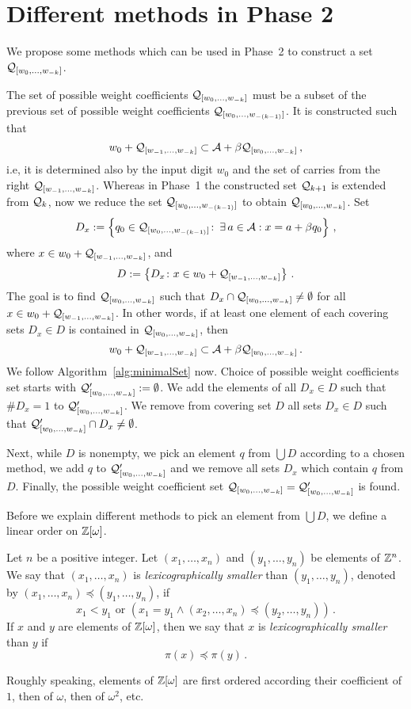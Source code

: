 \section{Different methods in Phase 2}
\label{sec:methodsTwo}
We propose some methods which can be used in Phase~2 to construct a set $\mathcal{Q}_{[w_{0}, \dots, w_{-k}]}$.

The set of possible weight coefficients $\mathcal{Q}_{[w_{0}, \dots, w_{-k}]}$ must be a subset of the previous set of possible weight coefficients $\mathcal{Q}_{[w_{0}, \dots, w_{-(k-1)}]}$. It is constructed such that
$$
 w_0 + \mathcal{Q}_{[w_{-1}, \dots, w_{-k}]} \subset \mathcal{A} + \beta \mathcal{Q}_{[w_{0}, \dots, w_{-k}]}\,,
$$
i.e, it is determined also by the input digit $w_0$ and the set of carries from the right $\mathcal{Q}_{[w_{-1}, \dots, w_{-k}]}$. Whereas in Phase~1 the constructed set $\mathcal{Q}_{k+1}$ is extended from $\mathcal{Q}_k$, now we  reduce the set $\mathcal{Q}_{[w_{0}, \dots, w_{-(k-1)}]}$ to obtain $\mathcal{Q}_{[w_{0}, \dots, w_{-k}]}$. Set 
$$
D_x:= \left\{q_0\in\mathcal{Q}_{[w_{0}, \dots, w_{-(k-1)}]}\colon\, \exists \, a\in\mathcal{A}: x=a+\beta q_0 \right\}\,,
$$
where $x\in w_0 + \mathcal{Q}_{[w_{-1}, \dots, w_{-k}]}$, and 
$$D:=\left\{D_x\colon x\in w_0 + \mathcal{Q}_{[w_{-1}, \dots, w_{-k}]}\right\}\,.$$
 The goal is to find $\mathcal{Q}_{[w_{0}, \dots, w_{-k}]}$ such that $D_x \cap \mathcal{Q}_{[w_{0}, \dots, w_{-k}]} \neq \emptyset$ for all $x\in w_0 + \mathcal{Q}_{[w_{-1}, \dots, w_{-k}]}$. In other words, if at least one element of each covering sets $D_x\in D$ is contained in $\mathcal{Q}_{[w_{0}, \dots, w_{-k}]}$, then 
$$
 w_0 + \mathcal{Q}_{[w_{-1}, \dots, w_{-k}]} \subset \mathcal{A} + \beta \mathcal{Q}_{[w_{0}, \dots, w_{-k}]}\,.
$$
We follow Algorithm~\ref{alg:minimalSet} now. Choice of possible weight coefficients set starts with $\mathcal{Q}_{[w_{0}, \dots, w_{-k}]}':=\emptyset$. We add the elements of all $D_x\in D$ such that $\#D_x=1$ to $\mathcal{Q}_{[w_{0}, \dots, w_{-k}]}'$. We remove from covering set $D$ all sets $D_x\in D$ such that $\mathcal{Q}_{[w_{0}, \dots, w_{-k}]}' \cap D_x \neq \emptyset$. 

Next, while $D$ is nonempty, we pick an element $q$ from $\bigcup D$ according to a chosen method, we add $q$ to $\mathcal{Q}_{[w_{0}, \dots, w_{-k}]}'$ and we remove all sets $D_x$ which contain $q$ from $D$. Finally, the possible weight coefficient set $\mathcal{Q}_{[w_{0}, \dots, w_{-k}]}=\mathcal{Q}_{[w_{0}, \dots, w_{-k}]}'$ is found.

Before we explain different methods  to pick an element from $\bigcup D$, we define a linear order on $\mathbb{Z}[\omega]$.

\begin{defn}
\label{def:lexicographical}
Let $n$ be a positive integer. Let $(x_1, \dots, x_n)$ and $(y_1, \dots, y_n)$ be elements of $\mathbb{Z}^n$. We say that  $(x_1, \dots, x_n)$ is \emph{lexicographically smaller} than $(y_1, \dots, y_n)$, denoted by $(x_1, \dots, x_n)\preceq (y_1, \dots, y_n)$, if 
$$
x_1<y_1 \text{ or } \left(x_1=y_1 \wedge (x_2, \dots, x_n)\preceq (y_2, \dots, y_n)\right)\,.
$$
If $x$ and $y$ are elements of $\mathbb{Z}[\omega]$, then we say that $x$ is \emph{lexicographically smaller} than $y$ if
$$
\pi(x) \preceq \pi(y)\,.
$$

\end{defn}
Roughly speaking, elements of $\mathbb{Z}[\omega]$ are first ordered according their coefficient  of $1$, then of $\omega$, then of $\omega^2$, etc.

